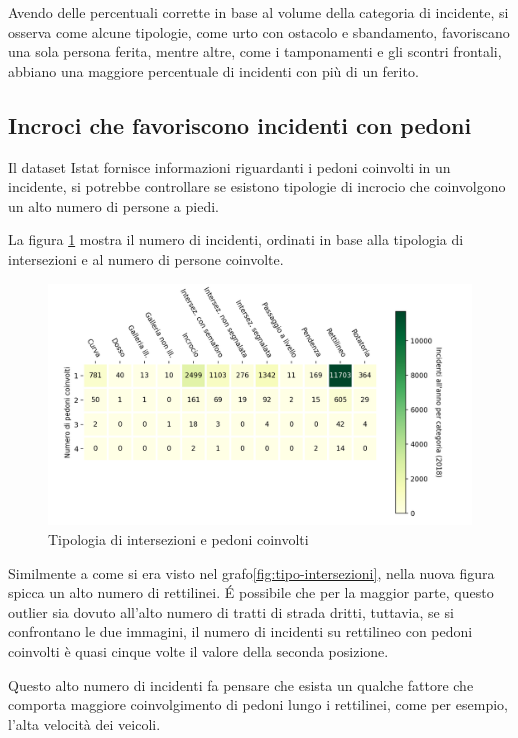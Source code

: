 \documentclass[a4paper]{report}
\begin{document}
Avendo delle percentuali corrette in base al volume della categoria di incidente, 
si osserva come alcune tipologie, come urto con ostacolo e sbandamento, 
favoriscano una sola persona ferita, mentre altre, come i tamponamenti e 
gli scontri frontali, abbiano una maggiore percentuale di 
incidenti con più di un ferito.

\subsection{Incroci che favoriscono incidenti con pedoni}

Il dataset Istat fornisce informazioni riguardanti i pedoni coinvolti in un incidente, 
si potrebbe controllare se esistono tipologie di incrocio che coinvolgono un 
alto numero di persone a piedi.

La figura \ref{fig:pedoni-intersezioni} mostra il numero di incidenti, 
ordinati in base alla tipologia di intersezioni e al numero di persone coinvolte.

\begin{figure}
    \includegraphics[width=\linewidth]{../src/incidenti/incidenti_senza_coords/pedoni/pedoni_incroci.png}
    \caption{Tipologia di intersezioni e pedoni coinvolti}
    \label{fig:pedoni-intersezioni}
\end{figure}

Similmente a come si era visto nel grafo\ref{fig:tipo-intersezioni}, nella nuova 
figura spicca un alto numero di rettilinei.
\'E possibile che per la maggior parte, questo outlier sia dovuto all'alto 
numero di tratti di strada dritti, tuttavia, se si confrontano le due immagini, 
il numero di incidenti su rettilineo con pedoni coinvolti è quasi cinque 
volte il valore della seconda posizione.

Questo alto numero di incidenti fa pensare che esista un qualche fattore 
che comporta maggiore coinvolgimento di pedoni lungo i rettilinei, come per 
esempio, l'alta velocità dei veicoli.
\end{document}
